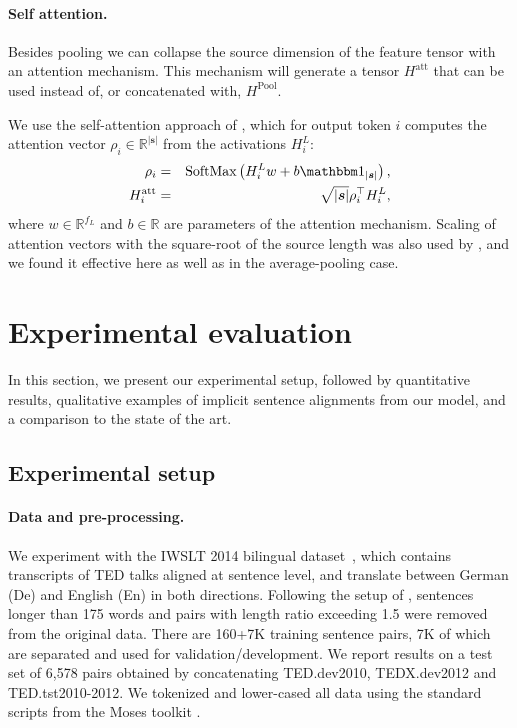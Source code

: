 \documentclass[11pt,a4paper]{article}
\newcommand{\lsrc}{{|\boldsymbol s|}}
\newcommand{\R}{\mathbb{R}}
\begin{document}
\paragraph{Self attention.}
Besides  pooling we can collapse the source dimension of the feature tensor with an attention mechanism. 
This mechanism will generate a tensor $H^\textrm{att}$ that can be used instead of, or concatenated with, $H^\text{Pool}$.

We use the self-attention approach of \citet{lin17iclr}, 
which for output token $i$ computes the attention vector $\rho_i \in\R^\lsrc$ from the  activations $H^L_i$:
\begin{eqnarray}
\rho_i  & = &\text{SoftMax}\left(H_{i}^L  w  + b  \mathbbm 1_{\lsrc}\right),\label{eq:attention1}\\
H_i^\text{att}  & = & \sqrt{\lsrc} \rho_{i}^\top H_i^L,
\label{eq:attention}
\end{eqnarray}
where $w \in\R^{f_L}$ and $b\in\R$ are parameters of the attention mechanism.
Scaling of attention vectors with the square-root of the source length was also used by \citet{gehring17icml}, and we found it effective here as well  as in the average-pooling case.



 
\section{Experimental evaluation}
\label{sec:experiments}

In this section, we present our experimental setup, 
followed by quantitative results, qualitative examples of implicit sentence alignments from our model, and a comparison to the state of the art.

\subsection{Experimental setup}
\paragraph{Data and pre-processing.}


We experiment with the IWSLT 2014 bilingual dataset~\cite{cettolo14iwslt}, which contains transcripts of TED talks aligned at sentence level, and translate between German (De) and English (En) in both directions.
Following the setup of \cite{edunov18naacl}, sentences longer than 175 words and pairs with length ratio exceeding 1.5 were removed from the original data.
There are 160+7K training sentence pairs, 7K of which are separated and used for validation/development.
We report results on a test set of 6,578 pairs obtained by concatenating TED.dev2010, TEDX.dev2012 and TED.tst2010-2012.
We tokenized and lower-cased all data using the standard scripts from the Moses toolkit \citep{koehn07acl}.
\end{document}
